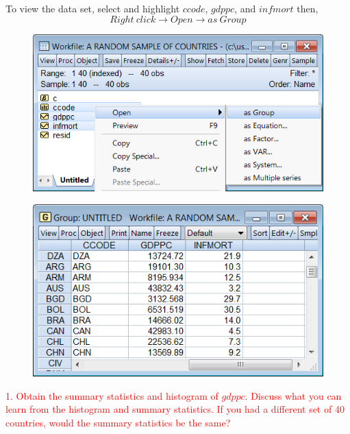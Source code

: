 \documentclass[12pt]{report}
\begin{document}
\noindent To view the data set, select and highlight $ccode$, $gdppc$, and $infmort$ then,
$$Right\ click \to Open \to as\ Group$$
\begin{figure}[H]
	\centerline{\includegraphics{2018sem2_q1}}
\end{figure}
\begin{figure}[H]
	\centerline{\includegraphics{2018sem2_q1_1}}
\end{figure}

\noindent \textcolor{red}{1. Obtain the summary statistics and histogram of $gdppc$. Discuss what you can learn from the histogram and summary statistics. If you had a different set of 40 countries, would the summary statistics be the same?}
\end{document}
